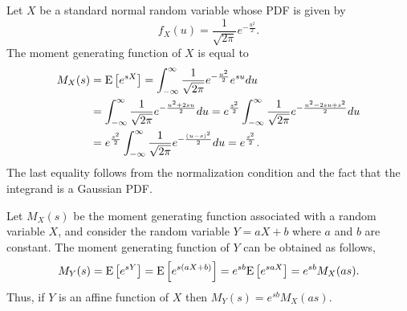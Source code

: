 \begin{example}
Let $X$ be a standard normal random variable whose PDF is given by
\begin{equation*}
f_X (u) = \frac{1}{\sqrt{2 \pi}} e^{- \frac{u^2}{2}}.
\end{equation*}
The moment generating function of $X$ is equal to
\begin{equation*}
\begin{split}
M_X (s) &= \mathrm{E} \left[ e^{sX} \right]
= \int_{- \infty}^{\infty} \frac{1}{\sqrt{2 \pi}} e^{- \frac{u^2}{2}} e^{su} du \\
&= \int_{- \infty}^{\infty} \frac{1}{\sqrt{2 \pi}} e^{- \frac{u^2 + 2 s u}{2}} du
= e^{\frac{s^2}{2}} \int_{- \infty}^{\infty}
\frac{1}{\sqrt{2 \pi}} e^{- \frac{u^2 - 2 s u + s^2}{2}} du \\
&= e^{\frac{s^2}{2}} \int_{- \infty}^{\infty}
\frac{1}{\sqrt{2 \pi}} e^{- \frac{(u - s)^2}{2}} du
= e^{\frac{s^2}{2}} .
\end{split}
\end{equation*}
The last equality follows from the normalization condition and the fact that the integrand is a Gaussian PDF.
\end{example}

Let $M_X(s)$ be the moment generating function associated with a random variable $X$, and consider the random variable $Y = aX + b$ where $a$ and $b$ are constant.
The moment generating function of $Y$ can be obtained as follows,
\begin{equation*}
M_Y (s) = \mathrm{E} \left[ e^{s Y} \right]
= \mathrm{E} \left[ e^{s (aX + b)} \right]
= e^{sb} \mathrm{E} \left[ e^{saX} \right]
= e^{sb} M_X (as) .
\end{equation*}
Thus, if $Y$ is an affine function of $X$ then $M_Y (s) = e^{sb} M_X (as)$.


